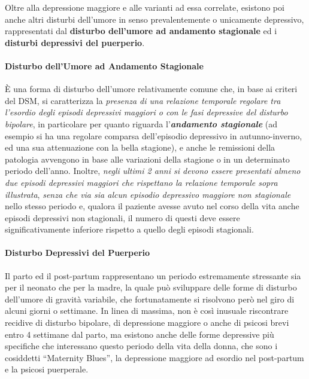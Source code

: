 Oltre alla depressione maggiore e alle varianti ad essa correlate,
esistono poi anche altri disturbi dell'umore in senso prevalentemente o
unicamente depressivo, rappresentati dal \textbf{disturbo dell'umore ad
andamento stagionale} ed i \textbf{disturbi depressivi del puerperio}.


\paragraph{Disturbo dell'Umore ad Andamento Stagionale}

  È una forma di disturbo dell'umore relativamente comune che, in base
  ai criteri del DSM, si caratterizza la \emph{presenza di una relazione
  temporale regolare tra l'esordio degli episodi depressivi maggiori o
  con le fasi depressive del disturbo bipolare}, in particolare per
  quanto riguarda l'\textbf{\emph{andamento stagionale}} (ad esempio si
  ha una regolare comparsa dell'episodio depressivo in autunno-inverno,
  ed una sua attenuazione con la bella stagione), e anche le remissioni
  della patologia avvengono in base alle variazioni della stagione o in
  un determinato periodo dell'anno. Inoltre, \emph{negli ultimi 2 anni
  si devono essere presentati almeno due episodi depressivi maggiori che
  rispettano la relazione temporale sopra illustrata}, \emph{senza che
  via sia alcun episodio depressivo maggiore non stagionale} nello
  stesso periodo e, qualora il paziente avesse avuto nel corso della
  vita anche episodi depressivi non stagionali, il numero di questi deve
  essere significativamente inferiore rispetto a quello degli episodi
  stagionali.


\paragraph{Disturbo Depressivi del Puerperio}

  Il parto ed il post-partum rappresentano un periodo estremamente
  stressante sia per il neonato che per la madre, la quale può
  sviluppare delle forme di disturbo dell'umore di gravità variabile,
  che fortunatamente si risolvono però nel giro di alcuni giorni o
  settimane. In linea di massima, non è così inusuale riscontrare
  recidive di disturbo bipolare, di depressione maggiore o anche di
  psicosi brevi entro 4 settimane dal parto, ma esistono anche delle
  forme depressive più specifiche che interessano questo periodo della
  vita della donna, che sono i cosiddetti ``Maternity Blues'', la
  depressione maggiore ad esordio nel post-partum e la psicosi
  puerperale.

